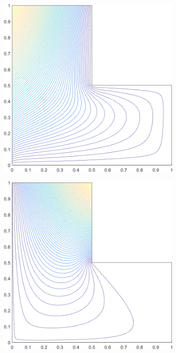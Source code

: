 \begin{figure}
\centering
	\begin{subfigure}[b]{0.39\textwidth}
		\centering
		\includegraphics[width=\textwidth]{figures/sec_BF/L-domain_MV1_contour_b6.png}
		\caption{}
	\end{subfigure}
	\hspace{1.5cm}
	\begin{subfigure}[b]{0.39\textwidth}
		\centering
		\includegraphics[width=\textwidth]{figures/sec_BF/L-domain_MV1_contour_b5.png}

\end{subfigure}
\end{figure}
